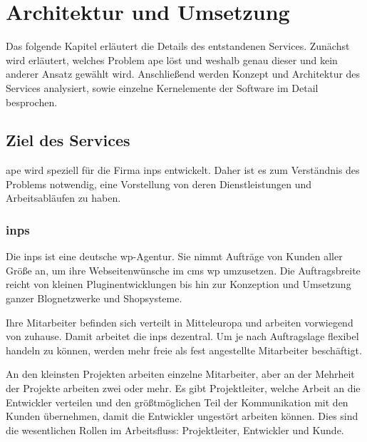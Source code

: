 

\section{Architektur und Umsetzung} %
\label{sec:architektur_und_umsetzung}

Das folgende Kapitel erläutert die Details des entstandenen Services. Zunächst wird erläutert, welches Problem \gls{ape} löst und weshalb genau dieser und kein anderer Ansatz gewählt wird. Anschließend werden Konzept und Architektur des Services analysiert, sowie einzelne Kernelemente der Software im Detail besprochen.

\subsection{Ziel des Services} %
\label{sub:ziel_des_services}

\gls{ape} wird speziell für die Firma \gls{inps} entwickelt. Daher ist es zum Verständnis des Problems notwendig, eine Vorstellung von deren Dienstleistungen und Arbeitsabläufen zu haben.

\subsubsection{\gls{inps}} %
\label{ssub:inps}


Die \gls{inps} ist eine deutsche \gls{wp}-Agentur. Sie nimmt Aufträge von Kunden aller Größe an, um ihre Webseitenwünsche im \gls{cms} \gls{wp} umzusetzen. Die Auftragsbreite reicht von kleinen Pluginentwicklungen bis hin zur Konzeption und Umsetzung ganzer Blognetzwerke und Shopsysteme.

Ihre Mitarbeiter befinden sich verteilt in Mitteleuropa und arbeiten vorwiegend von zuhause. Damit arbeitet die \gls{inps} dezentral. Um je nach Auftragslage flexibel handeln zu können, werden mehr freie als fest angestellte Mitarbeiter beschäftigt.

An den kleinsten Projekten arbeiten einzelne Mitarbeiter, aber an der Mehrheit der Projekte arbeiten zwei oder mehr. Es gibt Projektleiter, welche Arbeit an die Entwickler verteilen und den größtmöglichen Teil der Kommunikation mit den Kunden übernehmen, damit die Entwickler ungestört arbeiten können. Dies sind die wesentlichen Rollen im Arbeitsfluss: Projektleiter, Entwickler und Kunde.

